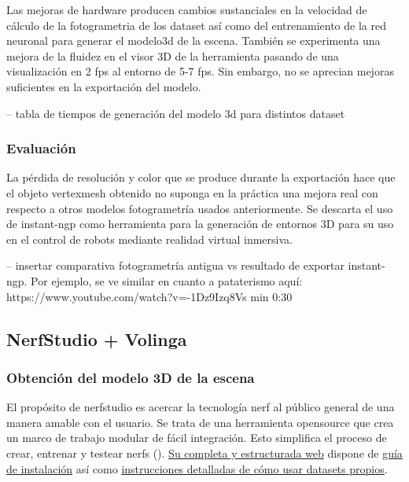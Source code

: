 \documentclass[a4paper, 12pt, spanish, twoside]{article}
\begin{document}
Las mejoras de hardware producen cambios sustanciales en la velocidad de cálculo de la \gls{fotogrametria} de los \gls{dataset} así como del entrenamiento de la red neuronal para generar el \gls{modelo3d} de la escena. También se experimenta una mejora de la fluidez en el visor 3D de la herramienta pasando de una visualización en 2 \acrshort{fps} al entorno de 5-7 \acrshort{fps}. Sin embargo, no se aprecian mejoras suficientes en la exportación del modelo. 

-- tabla de tiempos de generación del modelo 3d para distintos dataset 

\subsubsection{Evaluación} \label{sec:implementacion:instant-ngp:evaluacion}

La pérdida de resolución y color que se produce durante la exportación hace que el objeto \gls{vertexmesh} obtenido no suponga en la práctica una mejora real con respecto a otros modelos fotogrametría usados anteriormente. Se descarta el uso de \gls{instant-ngp} como herramienta para la generación de entornos 3D para su uso en el control de robots mediante realidad virtual inmersiva. 

-- insertar comparativa fotogrametría antigua vs resultado de exportar instant-ngp. Por ejemplo, se ve similar en cuanto a pataterismo aquí: https://www.youtube.com/watch?v=-1Dz9Izq8Vs min 0:30  

\subsection{NerfStudio + Volinga} \label{sec:implementacion:nerfstudio-volinga}

\subsubsection{Obtención del modelo 3D de la escena} \label{sec:implementacion:nerfstudio-volinga:obtencion}

El propósito de \gls{nerfstudio} es acercar la tecnología \acrshort{nerf} al público general de una manera amable con el usuario. Se trata de una herramienta \gls{opensource} que crea un marco de trabajo modular de fácil integración. Esto simplifica el proceso de crear, entrenar y testear \acrshort{nerf}s (\cite{nerfstudio}). \href{https://docs.nerf.studio/index.html}{Su completa y estructurada web} dispone de \href{https://docs.nerf.studio/quickstart/installation.html}{guía de instalación} así como \href{https://docs.nerf.studio/quickstart/custom_dataset.html}{instrucciones detalladas de cómo usar \glspl{dataset} propios}.  
\end{document}
